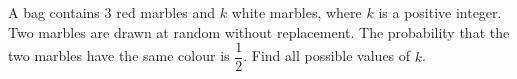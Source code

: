 A bag contains $3$ red marbles and $k$ white marbles, where $k$ is a positive integer. Two marbles are drawn at random without replacement. The probability that the two marbles have the same colour is $\dfrac{1}{2}$. Find all possible values of $k$.

